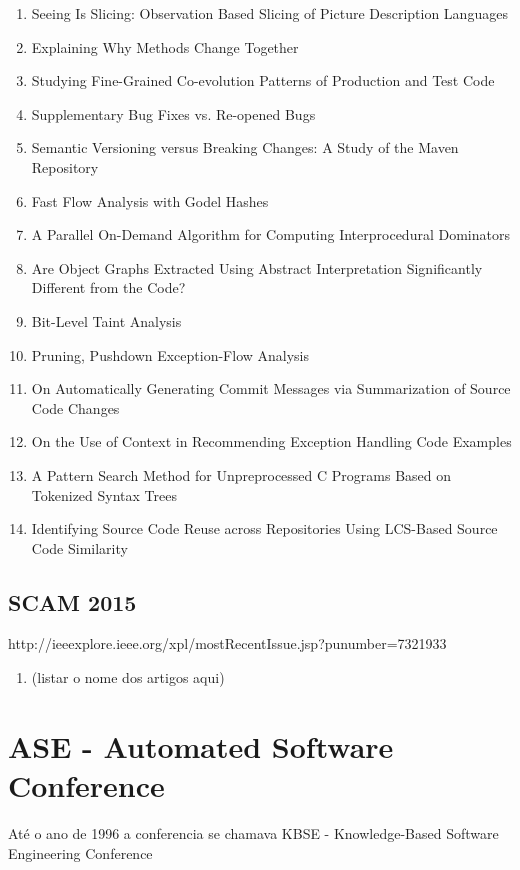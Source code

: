 \begin{enumerate}[itemsep=-1ex]
  \item Seeing Is Slicing: Observation Based Slicing of Picture Description Languages
  \item Explaining Why Methods Change Together
  \item Studying Fine-Grained Co-evolution Patterns of Production and Test Code
  \item Supplementary Bug Fixes vs. Re-opened Bugs
  \item Semantic Versioning versus Breaking Changes: A Study of the Maven Repository
  \item Fast Flow Analysis with Godel Hashes
  \item A Parallel On-Demand Algorithm for Computing Interprocedural Dominators
  \item Are Object Graphs Extracted Using Abstract Interpretation Significantly Different from the Code?
  \item Bit-Level Taint Analysis
  \item Pruning, Pushdown Exception-Flow Analysis
  \item On Automatically Generating Commit Messages via Summarization of Source Code Changes
  \item On the Use of Context in Recommending Exception Handling Code Examples
  \item A Pattern Search Method for Unpreprocessed C Programs Based on Tokenized Syntax Trees
  \item Identifying Source Code Reuse across Repositories Using LCS-Based Source Code Similarity
\end{enumerate}

\subsection{SCAM 2015}

http://ieeexplore.ieee.org/xpl/mostRecentIssue.jsp?punumber=7321933

\begin{enumerate}[itemsep=-1ex]
  \item (listar o nome dos artigos aqui)
\end{enumerate}


\section{ASE - Automated Software Conference}

Até o ano de 1996 a conferencia se chamava KBSE - Knowledge-Based Software
Engineering Conference

